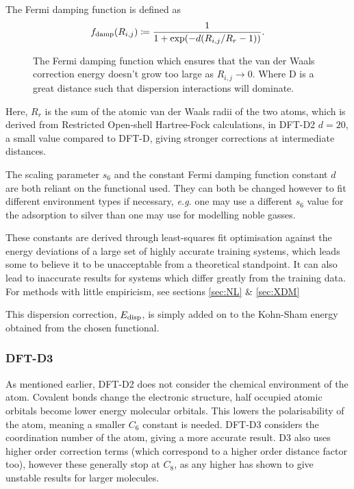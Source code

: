 \documentclass[10pt,a4paper,twocolumn,twoside]{extarticle}
\begin{document}
    The Fermi damping function is defined as
	\begin{align} \label{eq:damp}
		f_{\rm damp}(R_{i,j}) \coloneqq \frac{1}{1+\exp(-d(R_{i,j}/R_r -1))}.
	\end{align}

	\begin{figure}
		\caption{The Fermi damping function which ensures that the van der Waals correction energy doesn't grow too large as $R_{i,j} \rightarrow 0$. Where D is a great distance such that dispersion interactions will dominate.}
		\label{fig:Fermi}
	\end{figure}
	Here, $R_r$ is the sum of the atomic van der Waals radii of the two atoms, which is derived from Restricted Open-shell Hartree-Fock calculations, in DFT-D2 $d = 20$, a small value compared to DFT-D, giving stronger corrections at intermediate distances. 

	The scaling parameter $s_6$ and the constant Fermi damping function constant $d$ are both reliant on the functional used. They can both be changed however to fit different environment types if necessary, \emph{e.g.} one may use a different $s_6$ value for the adsorption to silver\cite{Schiavo2018} than one may use for modelling noble gasses.  

	These constants are derived through least-squares fit optimisation against the energy deviations of a large set of highly accurate training systems, which leads some to believe it to be unacceptable from a theoretical standpoint. It can also lead to inaccurate results for systems which differ greatly from the training data.\cite{Sato2009,Grimme2010,Jones2015} For methods with little empiricism, see sections \ref{sec:NL} \& \ref{sec:XDM}

	This dispersion correction, $E_{\rm disp}$, is simply added on to the Kohn-Sham energy obtained from the chosen functional.


	\subsubsection{DFT-D3}
	\label{sec:D3}
	As mentioned earlier, DFT-D2 does not consider the chemical environment of the atom. Covalent bonds change the electronic structure, half occupied atomic orbitals become lower energy molecular orbitals. This lowers the polarisability of the atom, meaning a smaller $C_6$ constant is needed. DFT-D3 considers the coordination number of the atom, giving a more accurate result.\cite{Grimme2010} D3 also uses higher order correction terms (which correspond to a higher order distance factor too), however these generally stop at $C_8$, as any higher has shown to give unstable results for larger molecules.
\end{document}
